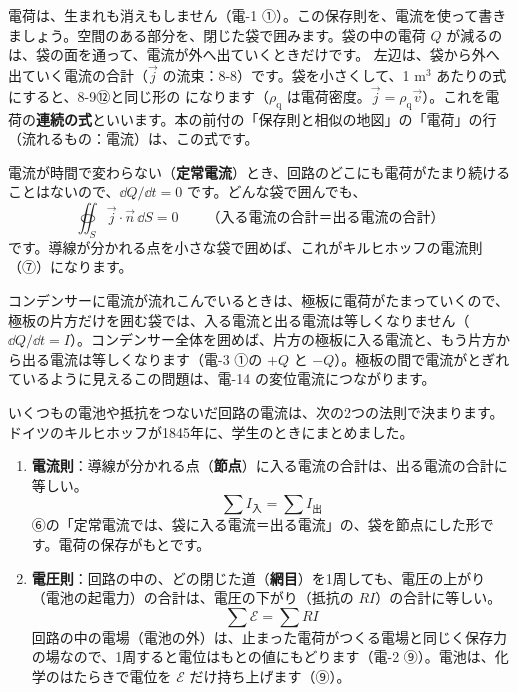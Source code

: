 \label{ph:電-4:sec6}
電荷は、生まれも消えもしません（電-1 ①）。この保存則を、電流を使って書きましょう。空間のある部分を、閉じた袋で囲みます。袋の中の電荷 $Q$ が減るのは、袋の面を通って、電流が外へ出ていくときだけです。
左辺は、袋から外へ出ていく電流の合計（$\vec j$ の流束：8-8）です。袋を小さくして、1 m$^3$ あたりの式にすると、8-9⑫と同じ形の
\label{ph:電-4:renzoku}になります（$\rho_{\mathrm q}$ は電荷密度。$\vec j=\rho_{\mathrm q}\vec v$）。これを電荷の\textbf{連続の式}といいます。本の前付の「保存則と相似の地図」の「電荷」の行（流れるもの：電流）は、この式です。

電流が時間で変わらない（\textbf{定常電流}）とき、回路のどこにも電荷がたまり続けることはないので、$\dd Q/\dd t=0$ です。どんな袋で囲んでも、
\[\oiint_S\vec j\cdot\vec n\,\dd S=0\qquad\text{（入る電流の合計＝出る電流の合計）}\]
です。導線が分かれる点を小さな袋で囲めば、これがキルヒホッフの電流則（⑦）になります。

\begin{seikaku}
コンデンサーに電流が流れこんでいるときは、極板に電荷がたまっていくので、極板の片方だけを囲む袋では、入る電流と出る電流は等しくなりません（$\dd Q/\dd t=I$）。コンデンサー全体を囲めば、片方の極板に入る電流と、もう片方から出る電流は等しくなります（電-3 ①の $+Q$ と $-Q$）。極板の間で電流がとぎれているように見えるこの問題は、電-14 の変位電流につながります。
\end{seikaku}

\label{ph:電-4:sec7}
いくつもの電池や抵抗をつないだ回路の電流は、次の2つの法則で決まります。ドイツのキルヒホッフが1845年に、学生のときにまとめました。
\label{ph:電-4:kirchhoff}
\begin{enumerate}[label={\bkcircled{\arabic*}}, leftmargin=2.4\zw, itemsep=3pt, topsep=3pt]
\item \textbf{電流則}：導線が分かれる点（\textbf{節点}）に入る電流の合計は、出る電流の合計に等しい。\[\sum I_{\text{入}}=\sum I_{\text{出}}\]
⑥の「定常電流では、袋に入る電流＝出る電流」の、袋を節点にした形です。電荷の保存がもとです。
\item \textbf{電圧則}：回路の中の、どの閉じた道（\textbf{網目}）を1周しても、電圧の上がり（電池の起電力）の合計は、電圧の下がり（抵抗の $RI$）の合計に等しい。\[\sum\mathcal E=\sum RI\]
回路の中の電場（電池の外）は、止まった電荷がつくる電場と同じく保存力の場なので、1周すると電位はもとの値にもどります（電-2 ⑨）。電池は、化学のはたらきで電位を $\mathcal E$ だけ持ち上げます（⑨）。
\end{enumerate}

